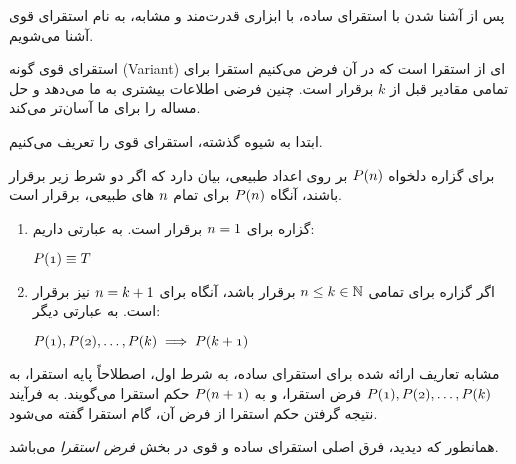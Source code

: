 پس از آشنا شدن با استقرای ساده، با ابزاری قدرت‌مند‌ و مشابه، به نام استقرای قوی آشنا می‌شویم.

استقرای قوی گونه (Variant)
ای از استقرا است که در آن فرض می‌کنیم استقرا برای تمامی مقادیر قبل از
$k$
برقرار است.
چنین فرضی اطلاعات بیشتری به ما می‌دهد و حل مساله را برای ما آسان‌تر می‌کند.

ابتدا به شیوه گذشته، استقرای قوی را تعریف می‌کنیم.

    \begin{DEFINITION}
        برای گزاره دلخواه
        $\mathnormal{P(n)}$
        بر روی اعداد طبیعی،
        بیان دارد که اگر دو شرط زیر برقرار باشند، آنگاه
        $\mathnormal{P(n)}$
        برای تمام 
        $\mathnormal{n}$
        های طبیعی، برقرار است.

        \begin{enumerate}
            \item گزاره برای 
                    $\mathnormal{n} = 1$
                     برقرار است. به عبارتی داریم:
                    \begin{flushleft}
                        $\mathnormal{P(1)} \equiv T$
                    \end{flushleft}
                    
            \item اگر گزاره برای تمامی
                    $\mathnormal{n} \leq k \in \mathbb{N}$
                    برقرار باشد، آنگاه برای
                    $\mathnormal{n} = k + 1$
                    نیز برقرار است. به عبارتی دیگر:
                    \begin{flushleft} 
                        $\mathnormal{P(1)}, \mathnormal{P(2)}, \ldots, \mathnormal{P(k)} \implies \mathnormal{P(k + 1)}$
                    \end{flushleft}

        \end{enumerate} 

        مشابه تعاریف ارائه شده برای استقرای ساده،
        به شرط اول، اصطلاحاً پایه استقرا، به 
        $\mathnormal{P(1)}, \mathnormal{P(2)}, \ldots, \mathnormal{P(k)}$
        فرض استقرا،
        و به
        $\mathnormal{P(n + 1)}$
        حکم استقرا می‌گویند.
        به فرآیند نتیجه گرفتن حکم استقرا از فرض آن، گام استقرا گفته می‌شود.


    \end{DEFINITION}

    همانطور که دیدید، فرق اصلی استقرای ساده و قوی در بخش
    \textit{فرض استقرا}
    می‌باشد.

